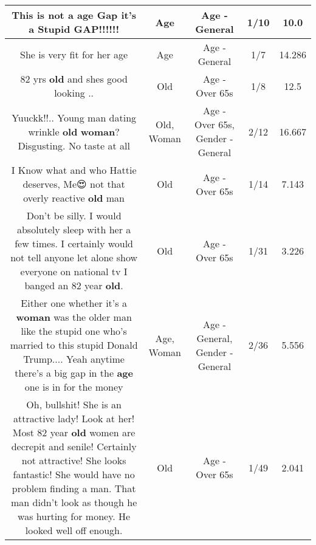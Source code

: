 \documentclass[11pt]{article}
\newlength\mylength
\begin{document}
\begin{center}
\begin{longtable}{|C{.65\mylength}|C{.30\mylength}|C{.12\mylength}|C{.12\mylength}|C{.12\mylength}|}
  \small This is not a \textbf{age} Gap it's a Stupid GAP!!!!!!\normalsize   & Age & Age - General & 1/10 & 10.0 \\  \hline
  \small She is very fit for her age\normalsize   & Age & Age - General & 1/7 & 14.286 \\  \hline
  \small 82 yrs \textbf{old} and shes good looking ..\normalsize   & Old & Age - Over 65s & 1/8 & 12.5 \\  \hline
  \small Yuuckk!!..  Young man dating wrinkle \textbf{old} \textbf{woman}? Disgusting. No taste at all\normalsize   & Old, Woman & Age - Over 65s, Gender - General & 2/12 & 16.667 \\  \hline
  \small I Know what and who Hattie deserves, Me😍 not that overly reactive \textbf{old} man\normalsize   & Old & Age - Over 65s & 1/14 & 7.143 \\  \hline
  \small Don't be silly. I would absolutely sleep with her a few times. I certainly would not tell anyone let alone show everyone on national tv I banged an 82 year \textbf{old}.\normalsize   & Old & Age - Over 65s & 1/31 & 3.226 \\  \hline
  \small Either one whether it's a \textbf{woman} was the older man like the stupid one who's married to this stupid Donald Trump.... Yeah anytime there's a big gap in the \textbf{age}  one is in for the money\normalsize   & Age, Woman & Age - General, Gender - General & 2/36 & 5.556 \\  \hline
  \small Oh, bullshit! She is an attractive lady! Look at her! Most 82 year \textbf{old} women are decrepit and senile! Certainly not attractive! She looks fantastic! She would have no problem finding a man. That man didn't look as though he was hurting for money. He looked well off enough.\normalsize   & Old & Age - Over 65s & 1/49 & 2.041 \\  \hline

\end{longtable}
\end{center}
\end{document}
